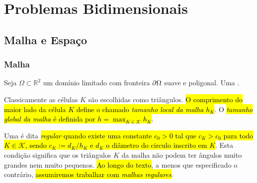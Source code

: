 \chapter{Problemas Bidimensionais}\label{cap_mef2d}

\section{Malha e Espaço}\label{cap_mef2d_sec_malha}
\badgeRevisar

\subsection{Malha}
\badgeRevisar

Seja $\Omega\subset \mathbb{R}^2$ um domínio limitado com fronteira $\partial\Omega$ suave e poligonal. Uma .

Classicamente as células $K$ são escolhidas como triângulos. \hl{O comprimento do maior lado da célula $K$ define o chamado \emph{tamanho local da malha} $h_K$}. O \hl{\emph{tamanho global da malha} é definida por $h = \max_{K\in\mathcal{K}} h_K$}.

Uma  é dita \hl{\emph{regular} quando existe uma constante $c_0 > 0$ tal que $c_K > c_0$ para todo $K\in\mathcal{K}$, sendo $c_K := d_K/h_K$ e $d_K$ o diâmetro do circulo inscrito em $K$}. Esta condição significa que os triângulos $K$ da malha não podem ter ângulos muito grandes nem muito pequenos. \hl{Ao longo do texto}, a menos que especificado o contrário, \hl{assumiremos trabalhar com \emph{malhas regulares}}.

